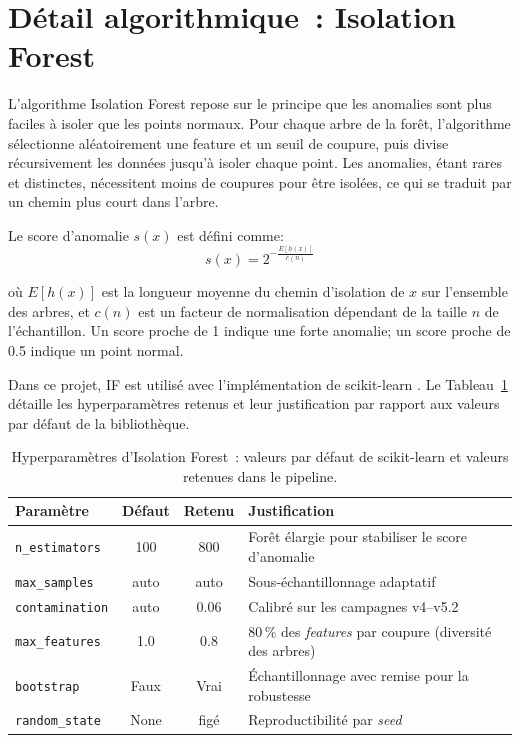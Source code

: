 \FloatBarrier
\section{Détail algorithmique~: Isolation Forest}

L'algorithme Isolation Forest \citep{liu2008isolation} repose sur le principe que les
anomalies sont plus faciles à isoler que les points normaux. Pour chaque arbre de la forêt,
l'algorithme sélectionne aléatoirement une feature et un seuil de coupure, puis divise
récursivement les données jusqu'à isoler chaque point. Les anomalies, étant rares et
distinctes, nécessitent moins de coupures pour être isolées, ce qui se traduit par un
chemin plus court dans l'arbre.

Le score d'anomalie $s(x)$ est défini comme:
\begin{equation}
    s(x) = 2^{-\frac{E[h(x)]}{c(n)}}
\end{equation}

\noindent
où $E[h(x)]$ est la longueur moyenne du chemin d'isolation de $x$ sur l'ensemble des
arbres, et $c(n)$ est un facteur de normalisation dépendant de la taille $n$ de
l'échantillon. Un score proche de 1 indique une forte anomalie; un score proche de 0.5
indique un point normal.

Dans ce projet, IF est utilisé avec l'implémentation de scikit-learn
\citep{sklearn_api}. Le Tableau~\ref{tab:hyperparams_if} détaille les hyperparamètres
retenus et leur justification par rapport aux valeurs par défaut de la bibliothèque.

\begin{table}[H]
    \centering
    \caption[Hyperparamètres d'Isolation Forest]{Hyperparamètres d'Isolation Forest~:
    valeurs par défaut de scikit-learn \citep{sklearn_api} et valeurs retenues dans
    le pipeline.}
    \label{tab:hyperparams_if}
    \begin{tabular}{lccl}
        \toprule
        \textbf{Paramètre} & \textbf{Défaut} & \textbf{Retenu} & \textbf{Justification} \\
        \midrule
        \texttt{n\_estimators} & 100 & 800 & Forêt élargie pour stabiliser le score d'anomalie \\
        \texttt{max\_samples} & auto & auto & Sous-échantillonnage adaptatif \\
        \texttt{contamination} & auto & 0.06 & Calibré sur les campagnes v4--v5.2 \\
        \texttt{max\_features} & 1.0 & 0.8 & 80\,\% des \textit{features} par coupure (diversité des arbres) \\
        \texttt{bootstrap} & Faux & Vrai & Échantillonnage avec remise pour la robustesse \\
        \texttt{random\_state} & None & figé & Reproductibilité par \textit{seed} \\
        \bottomrule
    \end{tabular}
\end{table}

